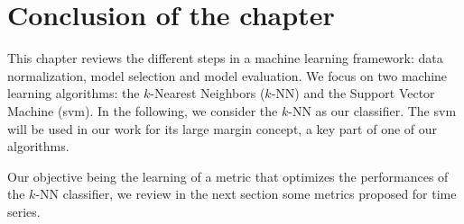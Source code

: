 


\section{Conclusion of the chapter}
This chapter reviews the different steps in a machine learning framework: data normalization, model selection and model evaluation. We focus on two machine learning algorithms: the $k$-Nearest Neighbors ($k$-NN) and the Support Vector Machine ({\sc svm}). In the following, we consider the $k$-NN as our classifier. The {\sc svm} will be used in our work for its large margin concept, a key part of one of our algorithms. 

Our objective being the learning of a metric that optimizes the performances of the $k$-NN classifier, we review in the next section some metrics proposed for time series.

